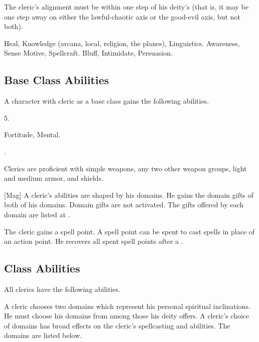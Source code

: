      The cleric's alignment must be within one step of his deity's (that is, it may be one step away on either the lawful-chaotic axis or the good-evil axis, but not both).

     Heal, Knowledge (arcana, local, religion, the planes), Linguistics.
     Awareness, Sense Motive, Spellcraft.
     Bluff, Intimidate, Persuasion.

    \subsection{Base Class Abilities}
        A character with cleric as a base class gains the following abilities.

         5.


          Fortitude,  Mental.

         .

        Clerics are proficient with simple weapons, any two other weapon groups, light and medium armor, and shields.

        [Mag]
        A cleric's abilities are shaped by his domains.
        He gains the domain gifts of both of his domains.
        Domain gifts are not activated.
        The gifts offered by each domain are listed at .

        The cleric gains a spell point.
        A spell point can be spent to cast spells in place of an action point.
        He recovers all spent spell points after a .

    \subsection{Class Abilities}
        All clerics have the following abilities.

        A cleric chooses two domains which represent his personal spiritual inclinations.
        He must choose his domains from among those his deity offers.
        A cleric's choice of domains has broad effects on the cleric's spellcasting and abilities.
        The domains are listed below.

